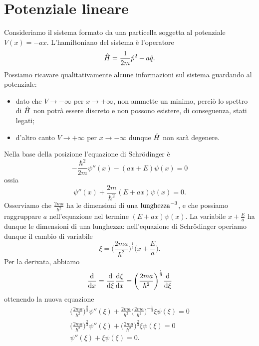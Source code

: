 \section{Potenziale lineare}
Consideriamo il sistema formato da una particella soggetta al potenziale $V(x)=-ax$.
L'hamiltoniano del sistema è l'operatore
\begin{equation}
	\hat{H}=\frac1{2m}\hat{p}^2-a\hat{q}.
	\label{eq:H-potenziale-lineare}
\end{equation}
Possiamo ricavare qualitativamente alcune informazioni sul sistema guardando al potenziale:
\begin{itemize}
	\item dato che $V\to-\infty$ per $x\to+\infty$, non ammette un minimo, perciò lo spettro di $\hat{H}$ non potrà essere discreto e non possono esistere, di conseguenza, stati legati;
	\item d'altro canto $V\to+\infty$ per $x\to-\infty$ dunque $\hat{H}$ non sarà degenere.
\end{itemize}
Nella base della posizione l'equazione di Schr\"odinger è
\begin{equation}
	-\frac{\hbar^2}{2m}\psi''(x)-(ax+E)\psi(x)=0
	\label{eq:schrodinger-posizione-potenziale-lineare}
\end{equation}
ossia
\begin{equation}
	\psi''(x)+\frac{2m}{\hbar^2}(E+ax)\psi(x)=0.
\end{equation}
Osserviamo che $\frac{2ma}{\hbar^2}$ ha le dimensioni di una $\textup{lunghezza}^{-3}$, e che possiamo raggruppare $a$ nell'equazione nel termine $(E+ax)\psi(x)$.
La variabile $x+\frac{E}{a}$ ha dunque le dimensioni di una lunghezza: nell'equazione di Schr\"odinger operiamo dunque il cambio di variabile
\begin{equation}
	\xi=\bigg(\frac{2ma}{\hbar^2}\bigg)^{\frac13}\bigg(x+\frac{E}{a}\bigg).
\end{equation}
Per la derivata, abbiamo
\begin{equation}
	\frac{\textup{d} {}}{\textup{d} {x}}=\frac{\textup{d} {}}{\textup{d} {\xi}}\frac{\textup{d} {\xi}}{\textup{d} {x}}=\bigg(\frac{2ma}{\hbar^2}\bigg)^{\frac13}\frac{\textup{d} {}}{\textup{d} {\xi}}
\end{equation}
ottenendo la nuova equazione
\begin{equation}
	\begin{gathered}
		\bigg(\frac{2ma}{\hbar^2}\bigg)^{\frac23}\psi''(\xi)+\frac{2ma}{\hbar^2}\bigg(\frac{2ma}{\hbar^2}\bigg)^{-\frac13}\xi\psi(\xi)=0\\
		\bigg(\frac{2ma}{\hbar^2}\bigg)^{\frac23}\psi''(\xi)+\bigg(\frac{2ma}{\hbar^2}\bigg)^{\frac23}\xi\psi(\xi)=0\\
		\psi''(\xi)+\xi\psi(\xi)=0.
	\end{gathered}
	\label{eq:soluzione-potenziale-lineare}
\end{equation}
